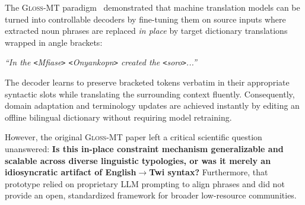 \documentclass[10pt,twocolumn]{article}
\newcommand{\gm}{\textsc{Gloss-MT}}
\newcommand{\term}[1]{\texttt{<}#1\texttt{>}}
\begin{document}
The \gm{} paradigm~\cite{owusu2024glossmt} demonstrated that machine translation models can be turned into controllable decoders by fine-tuning them on source inputs where extracted noun phrases are replaced \emph{in place} by target dictionary translations wrapped in angle brackets:
\begin{center}
\small
\emph{``In the \term{Mfiase} \term{Onyankopn} created the \term{\Textipa{O}soro}...''}
\end{center}
The decoder learns to preserve bracketed tokens verbatim in their appropriate syntactic slots while translating the surrounding context fluently. Consequently, domain adaptation and terminology updates are achieved instantly by editing an offline bilingual dictionary without requiring model retraining.

However, the original \gm{} paper left a critical scientific question unanswered: \textbf{Is this in-place constraint mechanism generalizable and scalable across diverse linguistic typologies, or was it merely an idiosyncratic artifact of English$\rightarrow$Twi syntax?} Furthermore, that prototype relied on proprietary LLM prompting to align phrases and did not provide an open, standardized framework for broader low-resource communities.
\end{document}
